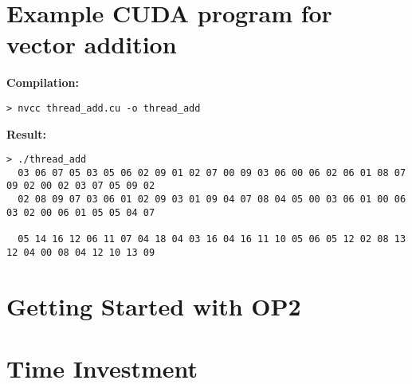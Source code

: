 
\appendixpage
\setcounter{section}{0}
\renewcommand{\thesection}{\Alph{section}}

\section{Example CUDA program for vector addition}
\label{app:cudaEx}

\vspace{-1em}
\begin{adjustwidth}{-.5in}{-.5in}
\textbf{Compilation:}
\begin{verbatim}
> nvcc thread_add.cu -o thread_add
\end{verbatim}
\textbf{Result:}
\begin{footnotesize}
\begin{verbatim}
> ./thread_add
  03 06 07 05 03 05 06 02 09 01 02 07 00 09 03 06 00 06 02 06 01 08 07 09 02 00 02 03 07 05 09 02
  02 08 09 07 03 06 01 02 09 03 01 09 04 07 08 04 05 00 03 06 01 00 06 03 02 00 06 01 05 05 04 07

  05 14 16 12 06 11 07 04 18 04 03 16 04 16 11 10 05 06 05 12 02 08 13 12 04 00 08 04 12 10 13 09
\end{verbatim}
\end{footnotesize}
\end{adjustwidth}
\section{Getting Started with OP2}
\label{app:getStart}

\section{Time Investment}

